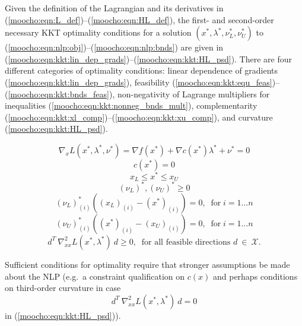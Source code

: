 \documentclass[pdf,ps2pdf,11pt]{SANDreport}
\begin{document}
{{Given the definition of the Lagrangian and its derivatives in
(\ref{moocho:eqn:L_def})--(\ref{moocho:eqn:HL_def}), the first- and
second-order necessary KKT optimality conditions {}\cite{ref:nash_sofer_1996}
for a solution $(x^*, \lambda^*, \nu^*_L, \nu^*_U)$ to
(\ref{moocho:eqn:nlp:obj})--(\ref{moocho:eqn:nlp:bnds}) are given in
(\ref{moocho:eqn:kkt:lin_dep_grads})--(\ref{moocho:eqn:kkt:HL_psd}).  There
are four different categories of optimality conditions: linear dependence of
gradients (\ref{moocho:eqn:kkt:lin_dep_grads}), feasibility
(\ref{moocho:eqn:kkt:equ_feas})--(\ref{moocho:eqn:kkt:bnds_feas}),
non-negativity of Lagrange multipliers for inequalities
(\ref{moocho:eqn:kkt:nonneg_bnds_mult}), complementarity
(\ref{moocho:eqn:kkt:xl_comp})--(\ref{moocho:eqn:kkt:xu_comp}), and curvature
(\ref{moocho:eqn:kkt:HL_psd}).

{\bsinglespace
\begin{equation}
\nabla_{x} L(x^*,\lambda^*,\nu^*) = \nabla f(x^*) + \nabla c(x^*) \lambda^* + \nu^* = 0
\label{moocho:eqn:kkt:lin_dep_grads}
\end{equation}
%
\begin{equation}
c(x^*) = 0
\label{moocho:eqn:kkt:equ_feas}
\end{equation}
%
\begin{equation}
x_L \leq x^* \leq x_U
\label{moocho:eqn:kkt:bnds_feas}
\end{equation}
%
\begin{equation}
(\nu_L)^*, (\nu_U)^* \geq 0
\label{moocho:eqn:kkt:nonneg_bnds_mult}
\end{equation}
%
\begin{equation}
(\nu_L)^*_{(i)} ( (x_L)_{(i)} - (x^*)_{(i)} ) = 0, \;\; \mbox{for} \; i = 1 \ldots n
\label{moocho:eqn:kkt:xl_comp}
\end{equation}
%
\begin{equation}
(\nu_U)^*_{(i)} ( (x^*)_{(i)} - (x_U)_{(i)} ) = 0, \;\; \mbox{for} \; i = 1 \ldots n
\label{moocho:eqn:kkt:xu_comp}
\end{equation}
%
\begin{equation}
d^T \: \nabla_{xx}^2 L(x^*,\lambda^*) \: d \geq 0, \;\; \mbox{for all feasible directions $d \:\in\:\mathcal{X}$}.
\label{moocho:eqn:kkt:HL_psd}
\end{equation}
\esinglespace}

Sufficient conditions for optimality require that stronger assumptions be made
about the NLP (e.g.\ a constraint qualification on $c(x)$ and perhaps
conditions on third-order curvature in case
%
\[
d^T \: \nabla_{xx}^2 L(x^*,\lambda^*) \: d = 0
\]
%
in (\ref{moocho:eqn:kkt:HL_psd})).

}}
\end{document}
